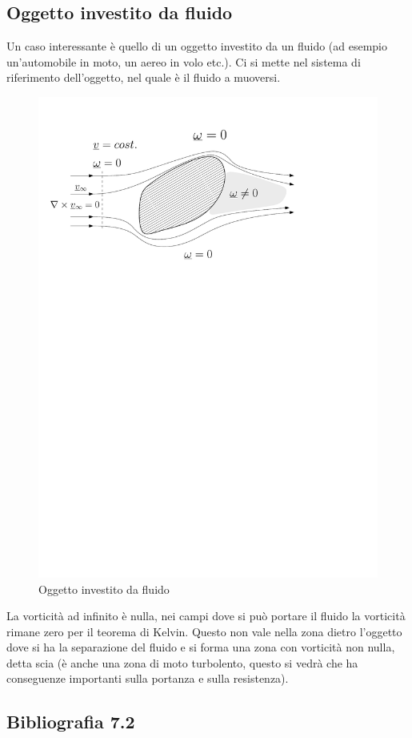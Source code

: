 \subsection{Oggetto investito da fluido}
Un caso interessante è quello di un oggetto investito da un fluido (ad esempio un'automobile in moto, un aereo in volo etc.).
Ci si mette nel sistema di riferimento dell'oggetto, nel quale è il fluido a muoversi.
	\begin{figure}[ht]
		\includegraphics[scale=0.8]{./7.2 Teorema di Kelvin/7.2-2}
		\centering
		\caption{Oggetto investito da fluido}
	\end{figure}
%
La vorticità ad infinito è nulla, nei campi dove si può portare il fluido la vorticità rimane zero per il teorema di Kelvin.
Questo non vale nella zona dietro l'oggetto dove si ha la separazione del fluido e si forma una zona con vorticità non nulla, detta scia (è anche una zona di moto turbolento, questo si vedrà che ha conseguenze importanti sulla portanza e sulla resistenza).

\subsection*{Bibliografia 7.2}
\cite[Cap.\ 11.3]{CengelCimbala}\\
\cite[Cap.\ 10.2]{PnueliGutfinger}
